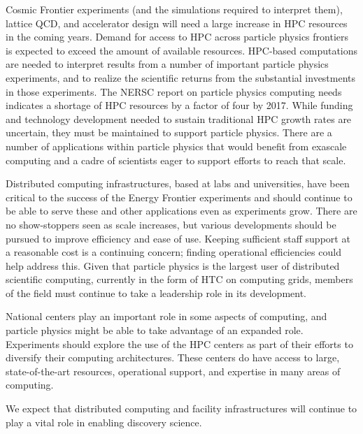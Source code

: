 Cosmic Frontier experiments (and the simulations required to interpret them), lattice QCD, and accelerator design will need a large increase in HPC resources in the coming years. Demand for access to HPC across particle physics frontiers is expected to exceed the amount of available resources.  HPC-based computations are needed to interpret results from a number of important particle physics experiments, and to realize the scientific returns from the substantial investments in those experiments.  The NERSC report on particle physics computing needs indicates a shortage of HPC resources by a factor of four by 2017.  While funding and technology development needed to sustain traditional HPC growth rates are uncertain, they must be maintained to support particle physics.  There are a number of applications within particle physics that would benefit from exascale computing and a cadre of scientists eager to support efforts to reach that scale.

Distributed computing infrastructures, based at labs and universities, have been critical to the success of the Energy Frontier experiments and should continue to be able to serve these and other applications even as experiments grow.  There are no show-stoppers seen as scale increases, but various developments should be pursued to improve efficiency and ease of use.  Keeping sufficient staff support at a reasonable cost is a continuing concern; finding operational efficiencies could help address this.  Given that particle physics is the largest user of distributed scientific computing, currently in the form of HTC on computing grids, members of the field must continue to take a leadership role in its development.

National centers play an important role in some aspects of computing, and particle physics might be able to take advantage of an expanded role.  Experiments should explore the use of the HPC centers as part of their efforts to diversify their computing architectures.  These centers do have access to large, state-of-the-art resources, operational support, and expertise in many areas of computing.

We expect that distributed computing and facility infrastructures will continue to play a vital role in enabling discovery science.

